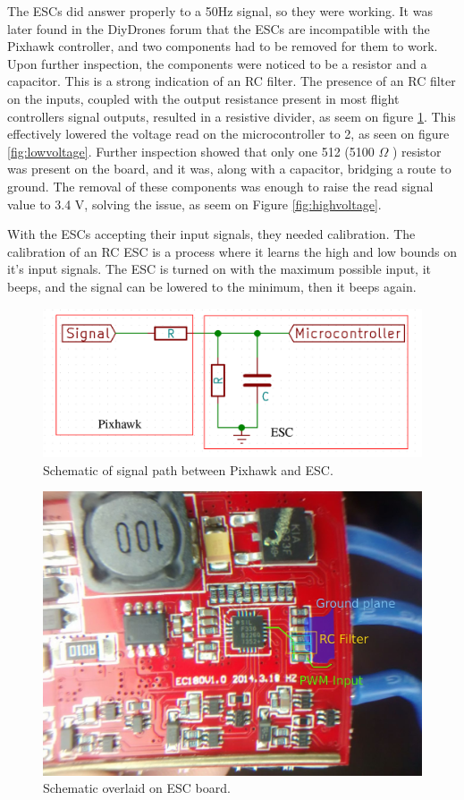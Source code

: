 The ESCs did answer properly to a 50Hz signal, so they were working.
%
It was later found in the DiyDrones\cite{diydronesesc} forum that the ESCs are incompatible with the Pixhawk controller, and two components had to be removed for them to work.
%
Upon further inspection, the components were noticed to be a resistor and a capacitor. This is a strong indication of an RC filter. The presence of an RC filter on the inputs, coupled with the output resistance present in most flight controllers signal outputs, resulted in a resistive divider, as seem on figure \ref{fig:divider}.
This effectively lowered the voltage read on the microcontroller to 2, as seen on figure \ref{fig:lowvoltage}.
Further inspection showed that only one 512 (5100 $\Omega$ ) resistor was present on the board, and it was, along with a capacitor, bridging a route to ground.
The removal of these components was enough to raise the read signal value to 3.4 V, solving the issue, as seem on Figure \ref{fig:highvoltage}.

With the ESCs accepting their input signals, they needed calibration. The calibration of an RC ESC is a process where it learns the high and low bounds on it's input signals. The ESC is turned on with the maximum possible input, it beeps, and the signal can be lowered to the minimum, then it beeps again.


\begin{figure}[H]
\centering
  \includegraphics[width=\linewidth]{figs/divider.png}
  \caption{Schematic of signal path between Pixhawk and ESC.}
  \label{fig:divider}
\end{figure}
	
\begin{figure}[H]
\centering
  \includegraphics[width=0.7\linewidth]{figs/escbeforeschematic.jpg}
  \caption{Schematic overlaid on ESC board.}
  \label{fig:divider2}
\end{figure}
	


